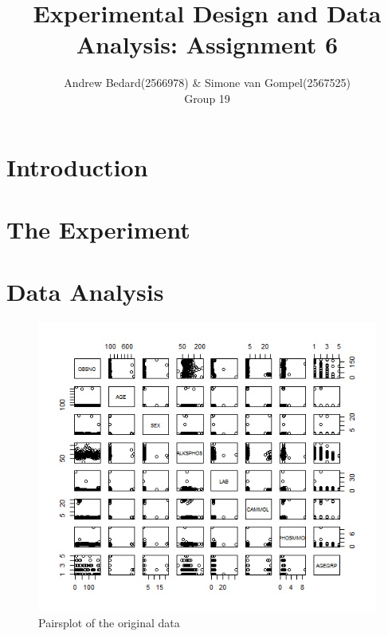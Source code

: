 \documentclass{article}
\title{Experimental Design and Data Analysis: Assignment 6}
\author{Andrew Bedard(2566978) \& Simone van Gompel(2567525) \\ Group 19}
\begin{document}
  \maketitle

  \section{Introduction}

  \section{The Experiment}

  \section{Data Analysis}
      \begin{figure}[H]
          \centering
          \includegraphics[scale=0.3]{../results/FirstPairs.png}
          \caption{Pairsplot of the original data}
          \label{fig:FirstPairs}
      \end{figure}
\end{document}
